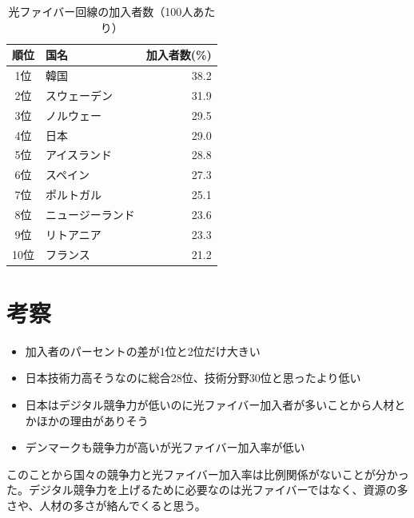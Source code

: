 \documentclass[a4paper,11pt,dvipdfmx]{ujarticle}
\begin{document}
 \begin{table}[htbp]
\centering
    \caption{光ファイバー回線の加入者数（100人あたり）}
    \label{tbl:整備状況}
 \begin{tabular}{|c|l|r|}\hline
順位 & 国名 & 加入者数(\%) \\
        \hline
        1位 & 韓国 & 38.2 \\
        \hline
        2位 & スウェーデン & 31.9 \\
        \hline
        3位 & ノルウェー & 29.5 \\
        \hline
        4位 & 日本 & 29.0 \\
        \hline
        5位 & アイスランド & 28.8 \\
        \hline
        6位 & スペイン & 27.3 \\
        \hline 
        7位 & ポルトガル & 25.1 \\
        \hline
        8位 & ニュージーランド & 23.6 \\
        \hline
        9位 & リトアニア & 23.3 \\
        \hline
        10位 & フランス & 21.2 \\
        \hline
 \end{tabular}   
 \end{table} 


%  
\section{考察}

\begin{itemize}
    \item  加入者のパーセントの差が1位と2位だけ大きい
    \item  日本技術力高そうなのに総合28位、技術分野30位と思ったより低い
    \item  日本はデジタル競争力が低いのに光ファイバー加入者が多いことから人材とかほかの理由がありそう
    \item  デンマークも競争力が高いが光ファイバー加入率が低い
\end{itemize}
このことから国々の競争力と光ファイバー加入率は比例関係がないことが分かった。デジタル競争力を上げるために必要なのは光ファイバーではなく、資源の多さや、人材の多さが絡んでくると思う。




\end{document}
